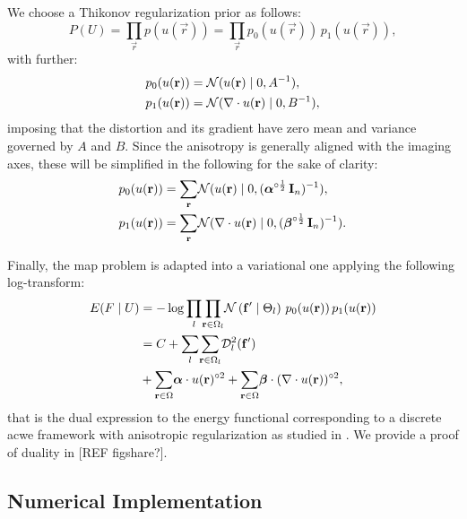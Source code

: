 We choose a Thikonov regularization prior as follows:
  \begin{equation*}
  P(U) = \underset{\vec{r}}{\prod} p(u(\vec{r})) =
  \underset{\vec{r}}{\prod} p_0(u(\vec{r})) \, p_1(u(\vec{r})),
  \end{equation*}
  with further:
  \begin{align*}
  p_0(u(\vec{r})) &= \mathcal{N}( u(\vec{r}) \mid 0, A^{-1}), \notag\\
  p_1(u(\vec{r})) &= \mathcal{N}(  \nabla \cdot u(\vec{r}) \mid 0, B^{-1}),
  \end{align*}
  imposing that the distortion and its gradient have zero
  mean and variance governed by $A$ and $B$.
Since the anisotropy is generally aligned with the imaging axes, these will be simplified
  in the following for the sake of clarity:
  \begin{align}
    p_0(u(\vec{r})) &= \underset{\vec{r}}{\sum} \mathcal{N}( u(\vec{r}) \mid 0,
      (\boldsymbol{\alpha}^{\circ\frac12}\,\vec{I}_n)^{-1}), \notag\\
    p_1(u(\vec{r})) &= \underset{\vec{r}}{\sum} \mathcal{N}( \nabla \cdot u(\vec{r}) \mid 0,
      (\boldsymbol{\beta}^{\circ\frac12}\,\vec{I}_n)^{-1}).
  \label{eq:priors}
  \end{align}

Finally, the \gls{map} problem is adapted into a variational one applying the
  following log-transform:
  \begin{align}
  E(F \mid U) &= -\log \underset{l}{\prod}
  \underset{\vec{r} \in \Omega_l}{\prod}
  \mathcal{N} \left( \vec{f}' \mid \Theta_l \right)\,p_0( u(\vec{r}))\,p_1( u(\vec{r})) \notag\\
  &= C + \underset{l}{\sum}
  \underset{\vec{r} \in \Omega_l}{\sum}
  \mdist{f'}{l} \notag\\
  &+ \underset{\vec{r} \in \Omega}{\sum} \boldsymbol{\alpha} \cdot u(\vec{r})^{\circ2}
  + \underset{\vec{r} \in \Omega}{\sum} \boldsymbol{\beta} \cdot (\nabla \cdot u(\vec{r}))^{\circ2},
  \label{eq:energy}
  \end{align}
  that is the dual expression to the energy functional corresponding
  to a discrete \gls*{acwe} framework \citep{chan_active_2001}
  with anisotropic regularization as studied in
  \citep{nagel_investigation_1986}.
We provide a proof of duality in {\color{red} [REF figshare?]}.


\subsection{Numerical Implementation}
\label{sec:numerical_implementation}

